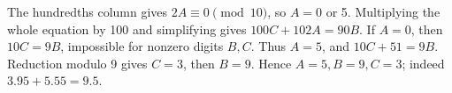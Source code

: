 The hundredths column gives $2A\equiv0\pmod{10}$, so $A=0$ or 5. Multiplying the whole equation by 100 and simplifying gives $100C+102A=90B$. If $A=0$, then $10C=9B$, impossible for nonzero digits $B,C$. Thus $A=5$, and $10C+51=9B$. Reduction modulo 9 gives $C=3$, then $B=9$. Hence $\boxed{A=5,B=9,C=3}$; indeed $3.95+5.55=9.5$.
